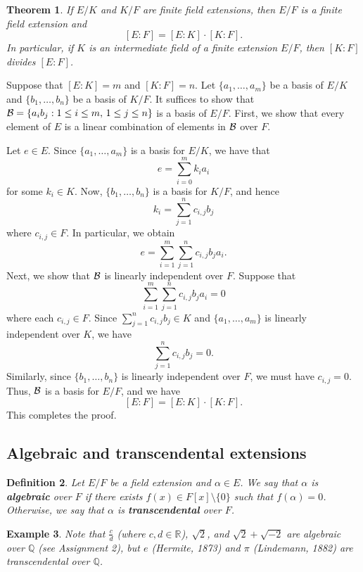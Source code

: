\documentclass[10pt]{article}
\makeatletter
\newcommand{\R}{\mathbb{R}}
\newcommand{\Q}{\mathbb{Q}}
\theoremstyle{newstyle}
\newtheorem{thm}{Theorem}[section]
\newtheorem{defn}[thm]{Definition}
\newtheorem{exmp}[thm]{Example}
\newenvironment{pf}[1][\proofname]{\par
  \pushQED{\qed}%
  \normalfont \topsep0\p@\relax
  \trivlist
  \item[\hskip\labelsep\scshape
  #1\@addpunct{.}]\ignorespaces
}{%
  \popQED\endtrivlist\@endpefalse
}
\makeatother
\begin{document}
\begin{thm}
If $E/K$ and $K/F$ are finite field extensions, then $E/F$ is a finite field extension and 
\[ [E : F] = [E : K] \cdot [K : F]. \]
In particular, if $K$ is an intermediate field of a finite extension $E/F$, then 
$[K : F]$ divides $[E : F]$.
\end{thm}
\begin{pf}
Suppose that $[E : K] = m$ and $[K : F] = n$. Let $\{a_1, \dots, a_m\}$ be a basis of 
$E/K$ and $\{b_1, \dots, b_n\}$ be a basis of $K/F$. It suffices to show that 
${\cal B} = \{a_ib_j : 1 \leq i \leq m,\, 1 \leq j \leq n\}$ is a basis of $E/F$. 
First, we show that every element of $E$ is a linear combination of elements in ${\cal B}$ over $F$. 

Let $e \in E$. Since $\{a_1, \dots, a_m\}$ is a basis for $E/K$, we have that 
\[ e = \sum_{i=0}^m k_i a_i \]
for some $k_i \in K$. Now, $\{b_1, \dots, b_n\}$ is a basis for $K/F$, and hence 
\[ k_i = \sum_{j=1}^n c_{i,j} b_j \] 
where $c_{i,j} \in F$. In particular, we obtain 
\[ e = \sum_{i=1}^m \sum_{j=1}^n c_{i,j} b_j a_i. \]
Next, we show that ${\cal B}$ is linearly independent over $F$. Suppose that 
\[ \sum_{i=1}^m \sum_{j=1}^n c_{i,j} b_j a_i = 0 \] 
where each $c_{i,j} \in F$. Since $\sum_{j=1}^n c_{i,j} b_j \in K$ and 
$\{a_1, \dots, a_m\}$ is linearly independent over $K$, we have 
\[ \sum_{j=1}^n c_{i,j} b_j = 0. \] 
Similarly, since $\{b_1, \dots, b_n\}$ is linearly independent over $F$, we must have 
$c_{i,j} = 0$. Thus, ${\cal B}$ is a basis for $E/F$, and we have 
\[ [E : F] = [E : K] \cdot [K : F]. \]
This completes the proof.
\end{pf}

\subsection{Algebraic and transcendental extensions}

\begin{defn}
Let $E/F$ be a field extension and $\alpha \in E$. We say that $\alpha$ is {\bf algebraic} 
over $F$ if there exists $f(x) \in F[x] \setminus \{0\}$ such that $f(\alpha) = 0$. 
Otherwise, we say that $\alpha$ is {\bf transcendental} over $F$.
\end{defn}

\begin{exmp}
Note that $\frac{c}d$ (where $c, d \in \R$), $\sqrt{2}$, and $\sqrt2 + \sqrt{-2}$ are 
algebraic over $\Q$ (see Assignment 2), but $e$ (Hermite, 1873) and $\pi$ (Lindemann, 1882) 
are transcendental over $\Q$.
\end{exmp}
\end{document}
